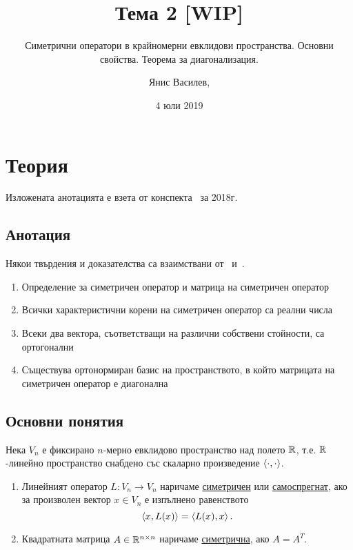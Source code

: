 \documentclass[numbers=endperiod, DIV=15, bibliography=totocnumbered]{scrartcl}
\title{Тема 2 [WIP]}
\subtitle{Симетрични оператори в крайномерни евклидови пространства. Основни свойства. Теорема за диагонализация.}
\author{Янис Василев, \Email{ianis@ivasilev.net}}
\date{4 юли 2019}
\begin{document}
\maketitle

\section{Теория}

Изложената анотацията е взета от конспекта~\cite{Syllabus} за 2018г.

\subsection{Анотация}

Някои твърдения и доказателства са взаимствани от~\cite{Knapp} и~\cite{RoyachkiNotes}.

\begin{enumerate}
  \item Определение за симетричен оператор и матрица на симетричен оператор
  \item Всички характеристични корени на симетричен оператор са реални числа
  \item Всеки два вектора, съответстващи на различни собствени стойности, са ортогонални
  \item Съществува ортонормиран базис на пространството, в който матрицата на симетричен оператор е диагонална
\end{enumerate}

\subsection{Основни понятия}

Нека $V_n$ е фиксирано $n$-мерно евклидово пространство над полето $\mathbb{R}$, т.е. $\mathbb{R}$-линейно пространство снабдено със скаларно произведение $\left\langle \cdot, \cdot \right\rangle$.

\begin{definition}
  \mbox{}
  \begin{enumerate}
    \item Линейният оператор $L: V_n \to V_n$ наричаме \uline{симетричен} или \uline{самоспрегнат}, ако за произволен вектор $x \in V_n$ е изпълнено равенството
    \begin{displaymath}
      \left\langle x, L(x) \right\rangle = \left\langle L(x), x \right\rangle.
    \end{displaymath}

    \item Квадратната матрица $A \in \mathbb{R}^{n \times n}$ наричаме \uline{симетрична}, ако $A = A^T$.
  \end{enumerate}
\end{definition}
\end{document}

